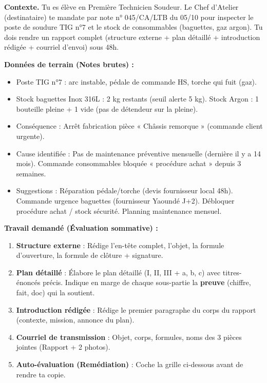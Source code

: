 \documentclass[11pt]{article}
\begin{document}
\begin{experience}
\textbf{Contexte.} Tu es élève en Première Technicien Soudeur. Le Chef d'Atelier (destinataire) te mandate par note n° 045/CA/LTB du 05/10 pour inspecter le poste de soudure TIG n°7 et le stock de consommables (baguettes, gaz argon). Tu dois rendre un rapport complet (structure externe + plan détaillé + introduction rédigée + courriel d'envoi) sous 48h.

\textbf{Données de terrain (Notes brutes) :}
\begin{itemize}
\item Poste TIG n°7 : arc instable, pédale de commande HS, torche qui fuit (gaz).
\item Stock baguettes Inox 316L : 2 kg restants (seuil alerte 5 kg). Stock Argon : 1 bouteille pleine + 1 vide (pas de détendeur sur la pleine).
\item Conséquence : Arrêt fabrication pièce « Châssis remorque » (commande client urgente).
\item Cause identifiée : Pas de maintenance préventive mensuelle (dernière il y a 14 mois). Commande consommables bloquée « procédure achat » depuis 3 semaines.
\item Suggestions : Réparation pédale/torche (devis fournisseur local 48h). Commande urgence baguettes (fournisseur Yaoundé J+2). Débloquer procédure achat / stock sécurité. Planning maintenance mensuel.
\end{itemize}

\textbf{Travail demandé (Évaluation sommative) :}
\begin{enumerate}
\item \textbf{Structure externe} : Rédige l'en-tête complet, l'objet, la formule d'ouverture, la formule de clôture + signature.
\item \textbf{Plan détaillé} : Élabore le plan détaillé (I, II, III + a, b, c) avec titres-énoncés précis. Indique en marge de chaque sous-partie la \textbf{preuve} (chiffre, fait, doc) qui la soutient.
\item \textbf{Introduction rédigée} : Rédige le premier paragraphe du corps du rapport (contexte, mission, annonce du plan).
\item \textbf{Courriel de transmission} : Objet, corps, formules, noms des 3 pièces jointes (Rapport + 2 photos).
\item \textbf{Auto-évaluation (Remédiation)} : Coche la grille ci-dessous avant de rendre ta copie.
\end{enumerate}


\end{experience}
\end{document}
